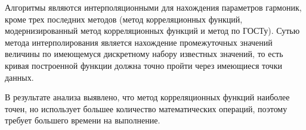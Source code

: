 





Алгоритмы являются интерполяционными для нахождения параметров гармоник, кроме трех последних методов (метод корреляционных функций, модернизированный метод корреляционных функций и метод по ГОСТу). Сутью метода интерполирования является нахождение промежуточных значений величины по имеющемуся дискретному набору известных значений, то есть кривая построенной функции должна точно пройти через имеющиеся точки данных.

В результате анализа выявлено, что метод корреляционных функций
наиболее точен, но использует большее количество математических операций,
поэтому требует большего времени на выполнение.


